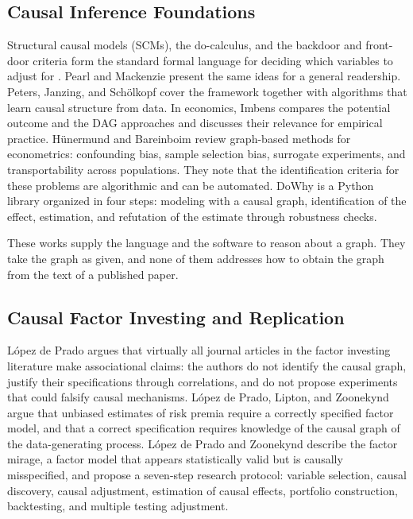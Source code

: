  \subsection{Causal Inference Foundations}\label{sec:sota_foundations}

  Structural causal models (SCMs), the do-calculus, and the backdoor and
  front-door criteria form the standard formal language for deciding which
  variables to adjust for \cite{pearl2009causality}. Pearl and Mackenzie
  \cite{pearl2018book} present the same ideas for a general readership.
  Peters, Janzing, and Sch{\"o}lkopf \cite{peters2017elements} cover the
  framework together with algorithms that learn causal structure from data.
  In economics, Imbens \cite{imbens2020potential} compares the potential
  outcome and the DAG approaches and discusses their relevance for empirical
  practice. H{\"u}nermund and Bareinboim \cite{hunermund2025causal} review
  graph-based methods for econometrics: confounding bias, sample selection
  bias, surrogate experiments, and transportability across populations. They
  note that the identification criteria for these problems are algorithmic
  and can be automated. DoWhy \cite{sharma2020dowhy} is a Python library
  organized in four steps: modeling with a causal graph, identification of
  the effect, estimation, and refutation of the estimate through robustness
  checks.

  These works supply the language and the software to reason about a graph.
  They take the graph as given, and none of them addresses how to obtain the
  graph from the text of a published paper.

  \subsection{Causal Factor Investing and Replication}\label{sec:sota_finance}

  L{\'o}pez de Prado \cite{lopezdeprado2023causal} argues that virtually all
  journal articles in the factor investing literature make associational
  claims: the authors do not identify the causal graph, justify their
  specifications through correlations, and do not propose experiments that
  could falsify causal mechanisms. L{\'o}pez de Prado, Lipton, and Zoonekynd
  \cite{lopezdeprado2024case} argue that unbiased estimates of risk premia
  require a correctly specified factor model, and that a correct
  specification requires knowledge of the causal graph of the data-generating
  process. L{\'o}pez de Prado and Zoonekynd \cite{lopezdeprado2024mirage}
  describe the factor mirage, a factor model that appears statistically valid
  but is causally misspecified, and propose a seven-step research protocol:
  variable selection, causal discovery, causal adjustment, estimation of
  causal effects, portfolio construction, backtesting, and multiple testing
  adjustment.

